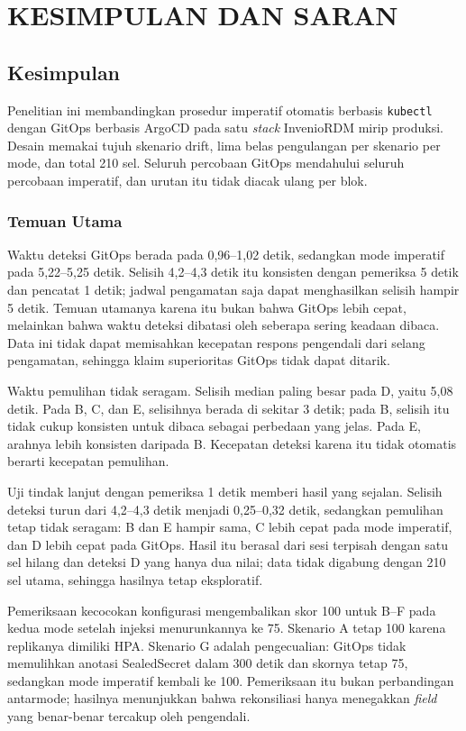 \chapter{KESIMPULAN DAN SARAN}

\section{Kesimpulan}

Penelitian ini membandingkan prosedur imperatif otomatis berbasis \texttt{kubectl} dengan GitOps berbasis ArgoCD pada satu \textit{stack} InvenioRDM mirip produksi. Desain memakai tujuh skenario drift, lima belas pengulangan per skenario per mode, dan total 210 sel. Seluruh percobaan GitOps mendahului seluruh percobaan imperatif, dan urutan itu tidak diacak ulang per blok.

\subsection{Temuan Utama}
\label{subsec:temuan-utama}

Waktu deteksi GitOps berada pada 0,96--1,02 detik, sedangkan mode imperatif pada 5,22--5,25 detik. Selisih 4,2--4,3 detik itu konsisten dengan pemeriksa 5 detik dan pencatat 1 detik; jadwal pengamatan saja dapat menghasilkan selisih hampir 5 detik. Temuan utamanya karena itu bukan bahwa GitOps lebih cepat, melainkan bahwa waktu deteksi dibatasi oleh seberapa sering keadaan dibaca. Data ini tidak dapat memisahkan kecepatan respons pengendali dari selang pengamatan, sehingga klaim superioritas GitOps tidak dapat ditarik.

Waktu pemulihan tidak seragam. Selisih median paling besar pada D, yaitu 5,08 detik. Pada B, C, dan E, selisihnya berada di sekitar 3 detik; pada B, selisih itu tidak cukup konsisten untuk dibaca sebagai perbedaan yang jelas. Pada E, arahnya lebih konsisten daripada B. Kecepatan deteksi karena itu tidak otomatis berarti kecepatan pemulihan.

Uji tindak lanjut dengan pemeriksa 1 detik memberi hasil yang sejalan. Selisih deteksi turun dari 4,2--4,3 detik menjadi 0,25--0,32 detik, sedangkan pemulihan tetap tidak seragam: B dan E hampir sama, C lebih cepat pada mode imperatif, dan D lebih cepat pada GitOps. Hasil itu berasal dari sesi terpisah dengan satu sel hilang dan deteksi D yang hanya dua nilai; data tidak digabung dengan 210 sel utama, sehingga hasilnya tetap eksploratif.

Pemeriksaan kecocokan konfigurasi mengembalikan skor 100 untuk B--F pada kedua mode setelah injeksi menurunkannya ke 75. Skenario A tetap 100 karena replikanya dimiliki HPA. Skenario G adalah pengecualian: GitOps tidak memulihkan anotasi SealedSecret dalam 300 detik dan skornya tetap 75, sedangkan mode imperatif kembali ke 100. Pemeriksaan itu bukan perbandingan antarmode; hasilnya menunjukkan bahwa rekonsiliasi hanya menegakkan \textit{field} yang benar-benar tercakup oleh pengendali.


